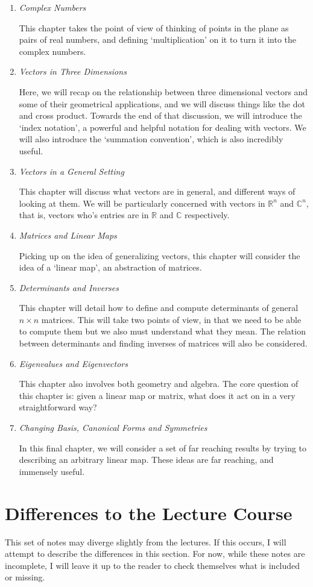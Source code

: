 \begin{enumerate}
	\item \emph{Complex Numbers}

	This chapter takes the point of view of thinking of points in the plane as pairs of real numbers, and defining `multiplication' on it to turn it into the complex numbers.

	\item \emph{Vectors in Three Dimensions}
	
	Here, we will recap on the relationship between three dimensional vectors and some of their geometrical applications, and we will discuss things like the dot and cross product. Towards the end of that discussion, we will introduce the `index notation', a powerful and helpful notation for dealing with vectors. We will also introduce the `summation convention', which is also incredibly useful.

	\item \emph{Vectors in a General Setting}
	
	This chapter will discuss what vectors are in general, and different ways of looking at them. We will be particularly concerned with vectors in $\mathbb{R}^n$ and $\mathbb{C}^n$, that is, vectors who's entries are in $\mathbb{R}$ and $\mathbb{C}$ respectively.

	\item \emph{Matrices and Linear Maps}
	
	Picking up on the idea of generalizing vectors, this chapter will consider the idea of a `linear map', an abstraction of matrices. 

	\item \emph{Determinants and Inverses}
	
	This chapter will detail how to define and compute determinants of general $n \times n$ matrices. This will take two points of view, in that we need to be able to compute them but we also must understand what they mean. The relation between determinants and finding inverses of matrices will also be considered.

	\item \emph{Eigenvalues and Eigenvectors}
	
	This chapter also involves both geometry and algebra. The core question of this chapter is: given a linear map or matrix, what does it act on in a very straightforward way?

	\item \emph{Changing Basis, Canonical Forms and Symmetries}
	
	In this final chapter, we will consider a set of far reaching results by trying to describing an arbitrary linear map. These ideas are far reaching, and immensely useful.
\end{enumerate}

\section{Differences to the Lecture Course}

This set of notes may diverge slightly from the lectures. If this occurs, I will attempt to describe the differences in this section.
For now, while these notes are incomplete, I will leave it up to the reader to check themselves what is included or missing.  
